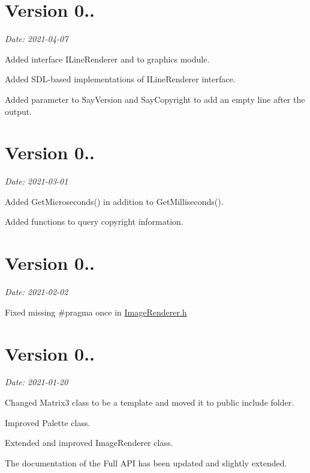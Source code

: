 \section*{Version 0..}

{\itshape Date\+: 2021-\/04-\/07}


\begin{DoxyItemize}
\item Added interface {\ttfamily I\+Line\+Renderer} and to graphics module.
\item Added S\+D\+L-\/based implementations of {\ttfamily I\+Line\+Renderer} interface.
\item Added parameter to {\ttfamily Say\+Version} and {\ttfamily Say\+Copyright} to add an empty line after the output.
\end{DoxyItemize}

\section*{Version 0..}

{\itshape Date\+: 2021-\/03-\/01}


\begin{DoxyItemize}
\item Added {\ttfamily Get\+Microseconds()} in addition to {\ttfamily Get\+Milliseconds()}.
\item Added functions to query copyright information.
\end{DoxyItemize}

\section*{Version 0..}

{\itshape Date\+: 2021-\/02-\/02}


\begin{DoxyItemize}
\item Fixed missing {\ttfamily \#pragma once} in \hyperlink{ImageRenderer_8h_source}{Image\+Renderer.\+h}
\end{DoxyItemize}

\section*{Version 0..}

{\itshape Date\+: 2021-\/01-\/20}


\begin{DoxyItemize}
\item Changed Matrix3 class to be a template and moved it to public include folder.
\item Improved {\ttfamily Palette} class.
\item Extended and improved {\ttfamily Image\+Renderer} class.
\item The documentation of the Full A\+PI has been updated and slightly extended.
\end{DoxyItemize}


